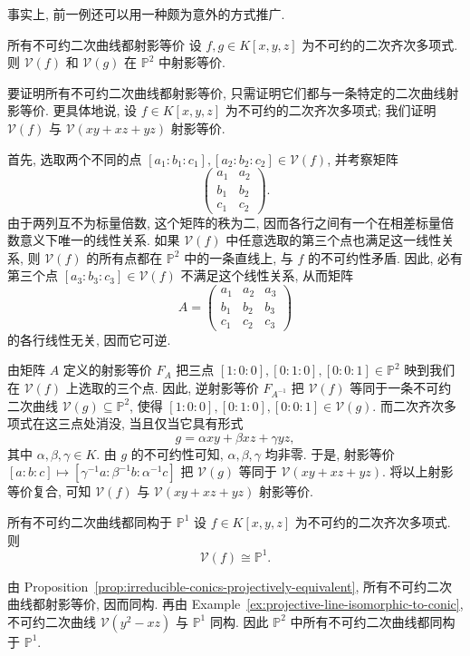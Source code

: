 事实上, 前一例还可以用一种颇为意外的方式推广.

\begin{Proposition}{所有不可约二次曲线都射影等价}\leavevmode\label{prop:irreducible-conics-projectively-equivalent}
设 $f,g\in K[x,y,z]$ 为不可约的二次齐次多项式. 则 $\mathcal{V}(f)$ 和 $\mathcal{V}(g)$ 在 $\mathbb{P}^{2}$ 中射影等价.
\end{Proposition}
\begin{Proof}
要证明所有不可约二次曲线都射影等价, 只需证明它们都与一条特定的二次曲线射影等价. 更具体地说, 设 $f\in K[x,y,z]$ 为不可约的二次齐次多项式; 我们证明 $\mathcal{V}(f)$ 与 $\mathcal{V}(xy+xz+yz)$ 射影等价.

首先, 选取两个不同的点 $[a_{1}:b_{1}:c_{1}],[a_{2}:b_{2}:c_{2}]\in\mathcal{V}(f)$, 并考察矩阵
\[
  \begin{pmatrix}
    a_{1}&a_{2}\\
    b_{1}&b_{2}\\
    c_{1}&c_{2}
  \end{pmatrix}.
\]
由于两列互不为标量倍数, 这个矩阵的秩为二, 因而各行之间有一个在相差标量倍数意义下唯一的线性关系. 如果 $\mathcal{V}(f)$ 中任意选取的第三个点也满足这一线性关系, 则 $\mathcal{V}(f)$ 的所有点都在 $\mathbb{P}^{2}$ 中的一条直线上, 与 $f$ 的不可约性矛盾. 因此, 必有第三个点 $[a_{3}:b_{3}:c_{3}]\in\mathcal{V}(f)$ 不满足这个线性关系, 从而矩阵
\[
  A=\begin{pmatrix}
    a_{1}&a_{2}&a_{3}\\
    b_{1}&b_{2}&b_{3}\\
    c_{1}&c_{2}&c_{3}
  \end{pmatrix}
\]
的各行线性无关, 因而它可逆.

由矩阵 $A$ 定义的射影等价 $F_{A}$ 把三点 $[1:0:0],[0:1:0],[0:0:1]\in\mathbb{P}^{2}$ 映到我们在 $\mathcal{V}(f)$ 上选取的三个点. 因此, 逆射影等价 $F_{A^{-1}}$ 把 $\mathcal{V}(f)$ 等同于一条不可约二次曲线 $\mathcal{V}(g)\subseteq\mathbb{P}^{2}$, 使得 $[1:0:0],[0:1:0],[0:0:1]\in\mathcal{V}(g)$. 而二次齐次多项式在这三点处消没, 当且仅当它具有形式
\[
  g=\alpha xy+\beta xz+\gamma yz,
\]
其中 $\alpha,\beta,\gamma\in K$. 由 $g$ 的不可约性可知, $\alpha,\beta,\gamma$ 均非零. 于是, 射影等价 $[a:b:c]\mapsto[\gamma^{-1}a:\beta^{-1}b:\alpha^{-1}c]$ 把 $\mathcal{V}(g)$ 等同于 $\mathcal{V}(xy+xz+yz)$. 将以上射影等价复合, 可知 $\mathcal{V}(f)$ 与 $\mathcal{V}(xy+xz+yz)$ 射影等价.
\end{Proof}

\begin{Corollary}{所有不可约二次曲线都同构于 $\mathbb{P}^{1}$}\leavevmode\label{cor:irreducible-conics-isomorphic-to-projective-line}
设 $f\in K[x,y,z]$ 为不可约的二次齐次多项式. 则
\[
  \mathcal{V}(f)\cong\mathbb{P}^{1}.
\]
\end{Corollary}
\begin{Proof}
由 Proposition~\ref{prop:irreducible-conics-projectively-equivalent}, 所有不可约二次曲线都射影等价, 因而同构. 再由 Example~\ref{ex:projective-line-isomorphic-to-conic}, 不可约二次曲线 $\mathcal{V}(y^{2}-xz)$ 与 $\mathbb{P}^{1}$ 同构. 因此 $\mathbb{P}^{2}$ 中所有不可约二次曲线都同构于 $\mathbb{P}^{1}$.
\end{Proof}

